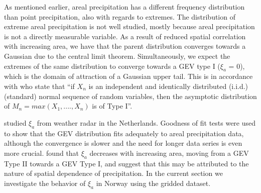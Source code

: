 \documentclass[12pt,a4paper,english]{article}
\begin{document}
As mentioned earlier, areal precipitation has a different frequency distribution than point precipitation, also with regards to extremes. The distribution of extreme areal precipitation is not well studied, mostly because areal precipitation is not a directly measurable variable. As a result of reduced spatial correlation with increasing area, we have that the parent distribution converges towards a Gaussian due to the central limit theorem. Simultaneously, we expect the extremes of the same distribution to converge towards a GEV type I ($\xi_{a}$ = 0), which is the domain of attraction of a Gaussian upper tail. This is in accordance with \cite{Leadbetteretal1980} who state that ``if $X_{n}$ is an independent and identically distributed (i.i.d.) (standard) normal sequence of random variables, then the asymptotic distribution of $M_{n} = max(X_{1},....,X_{n})$ is of Type I''.

    
\cite{Overeemetal2010} studied $\xi_{a}$ from weather radar in the Netherlands. Goodness of fit tests were used to show that the GEV distribution fits adequately to areal precipitation data, although the convergence is slower and the need for longer data series is even more crucial. \cite{Overeemetal2010} found that $\xi_{a}$ decreases with increasing area, moving from a GEV Type II towards a GEV Type I, and suggest that this may be attributed to the nature of spatial dependence of precipitation. 
In the current section we investigate the behavior of $\xi_{a}$ in Norway using the gridded dataset. 

\end{document}
